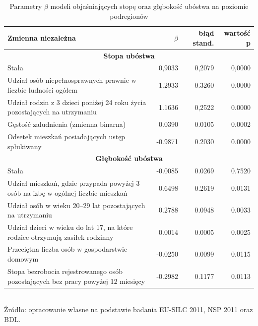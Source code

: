 \begin{table}[htp]
\centering
\caption{Parametry $\beta$ modeli objaśniających stopę oraz głębokość ubóstwa na poziomie podregionów}
\label{tab:podreg_beta}
\begin{tabular}{p{10cm}rrr}
\hline
Zmienna niezależna & $\beta$ & błąd stand. & wartość p \\
\hline
\multicolumn{4}{c}{\textbf{Stopa ubóstwa}}                \\
\hline
Stała   & 0,9033 & 0,2079 & 0,0000 \\
Udział osób niepełnosprawnych prawnie w liczbie ludności ogółem & 1.2933 & 0.3260 & 0.0000\\
Udział rodzin z 3 dzieci poniżej 24 roku życia pozostających na utrzymaniu & 1.1636 & 0,2522 & 0.0000 \\
Gęstość zaludnienia (zmienna binarna) & 0.0390 & 0.0105 & 0.0002 \\
Odsetek mieszkań posiadających ustęp spłukiwany & -0.9871 & 0.2030 & 0.0000 \\
\hline
\multicolumn{4}{c}{\textbf{Głębokość ubóstwa}}            \\
\hline
Stała & -0.0085 & 0.0269 & 0.7520 \\
Udział mieszkań, gdzie przypada powyżej 3 osób na izbę w ogólnej liczbie mieszkań & 0.6498 & 0.2619 & 0.0131 \\
Udział osób w wieku 20--29 lat pozostających na utrzymaniu & 0.2788 & 0.0948 & 0.0033\\
Udział dzieci w wieku do lat 17, na które rodzice otrzymują zasiłek rodzinny & 0.0014 & 0.0005 & 0.0025 \\
Przeciętna liczba osób w gospodarstwie domowym & -0.0250 & 0.0099 & 0.0115 \\
Stopa bezrobocia rejestrowanego osób pozostających bez pracy powyżej 12 miesięcy & -0.2982 & 0.1177 & 0.0113 \\
\hline
\end{tabular}\\
\small{Źródło: opracowanie własne na podstawie badania EU-SILC 2011, NSP 2011 oraz BDL.}
\end{table}

